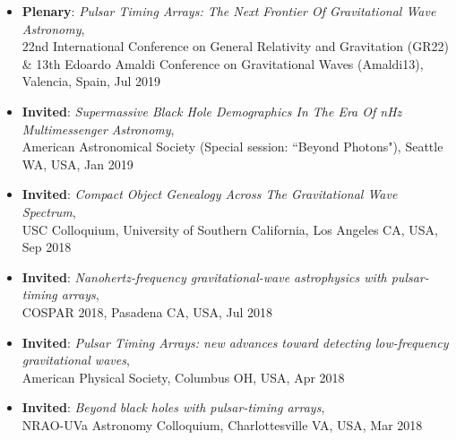 \documentclass[11pt,letterpaper,sans]{moderncv}
\begin{document}
\begin{itemize}[leftmargin=8mm]

\item \textbf{Plenary}: \textit{Pulsar Timing Arrays: The Next Frontier Of Gravitational Wave Astronomy}, \\ 22nd International Conference on General Relativity and Gravitation (GR22) \& 13th Edoardo Amaldi Conference on Gravitational Waves (Amaldi13), Valencia, Spain, Jul 2019

\item \textbf{Invited}: \textit{Supermassive Black Hole Demographics In The Era Of nHz Multimessenger Astronomy}, \\ American Astronomical Society (Special session: ``Beyond Photons"), Seattle WA, USA, Jan 2019

\item \textbf{Invited}: \textit{Compact Object Genealogy Across The Gravitational Wave Spectrum}, \\ USC Colloquium, University of Southern California, Los Angeles CA, USA, Sep 2018

\item \textbf{Invited}: \textit{Nanohertz-frequency gravitational-wave astrophysics with pulsar-timing arrays}, \\ COSPAR 2018, Pasadena CA, USA, Jul 2018

\item \textbf{Invited}: \textit{Pulsar Timing Arrays: new advances toward detecting low-frequency gravitational waves},\\ American Physical Society, Columbus OH, USA, Apr 2018

\item \textbf{Invited}: \textit{Beyond black holes with pulsar-timing arrays}, \\ NRAO-UVa Astronomy Colloquium, Charlottesville VA, USA, Mar 2018



\end{itemize}
\end{document}

